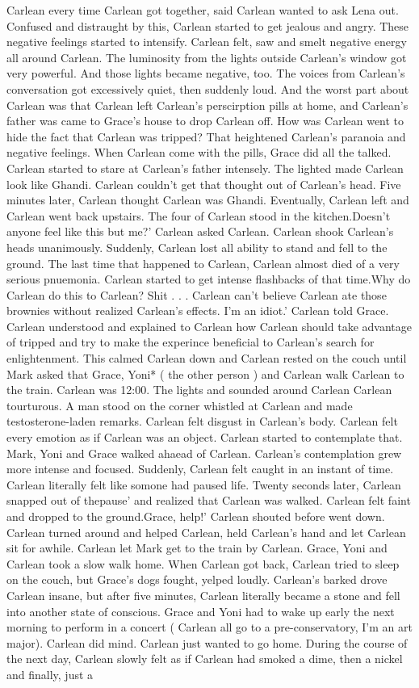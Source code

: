 \documentclass[12pt]{book}
\begin{document}
Carlean every time Carlean got together, said Carlean wanted to ask Lena out. Confused and distraught by this, Carlean started to get jealous and angry. These negative feelings started to intensify. Carlean felt, saw and smelt negative energy all around Carlean. The luminosity from the lights outside Carlean's window got very powerful. And those lights became negative, too. The voices from Carlean's conversation got excessively quiet, then suddenly loud. And the worst part about Carlean was that Carlean left Carlean's perscirption pills at home, and Carlean's father was came to Grace's house to drop Carlean off. How was Carlean went to hide the fact that Carlean was tripped? That heightened Carlean's paranoia and negative feelings. When Carlean come with the pills, Grace did all the talked. Carlean started to stare at Carlean's father intensely. The lighted made Carlean look like Ghandi. Carlean couldn't get that thought out of Carlean's head. Five minutes later, Carlean thought Carlean was Ghandi. Eventually, Carlean left and Carlean went back upstairs. The four of Carlean stood in the kitchen.Doesn't anyone feel like this but me?' Carlean asked Carlean. Carlean shook Carlean's heads unanimously. Suddenly, Carlean lost all ability to stand and fell to the ground. The last time that happened to Carlean, Carlean almost died of a very serious pnuemonia. Carlean started to get intense flashbacks of that time.Why do Carlean do this to Carlean? Shit . . .  Carlean can't believe Carlean ate those brownies without realized Carlean's effects. I'm an idiot.' Carlean told Grace. Carlean understood and explained to Carlean how Carlean should take advantage of tripped and try to make the experince beneficial to Carlean's search for enlightenment. This calmed Carlean down and Carlean rested on the couch until Mark asked that Grace, Yoni* ( the other person ) and Carlean walk Carlean to the train. Carlean was 12:00. The lights and sounded around Carlean Carlean tourturous. A man stood on the corner whistled at Carlean and made testosterone-laden remarks. Carlean felt disgust in Carlean's body. Carlean felt every emotion as if Carlean was an object. Carlean started to contemplate that. Mark, Yoni and Grace walked ahaead of Carlean. Carlean's contemplation grew more intense and focused. Suddenly, Carlean felt caught in an instant of time. Carlean literally felt like somone had paused life. Twenty seconds later, Carlean snapped out of thepause' and realized that Carlean was walked. Carlean felt faint and dropped to the ground.Grace, help!' Carlean shouted before went down. Carlean turned around and helped Carlean, held Carlean's hand and let Carlean sit for awhile. Carlean let Mark get to the train by Carlean. Grace, Yoni and Carlean took a slow walk home. When Carlean got back, Carlean tried to sleep on the couch, but Grace's dogs fought, yelped loudly. Carlean's barked drove Carlean insane, but after five minutes, Carlean literally became a stone and fell into another state of conscious. Grace and Yoni had to wake up early the next morning to perform in a concert ( Carlean all go to a pre-conservatory, I'm an art major). Carlean did mind. Carlean just wanted to go home. During the course of the next day, Carlean slowly felt as if Carlean had smoked a dime, then a nickel and finally, just a 
\end{document}
